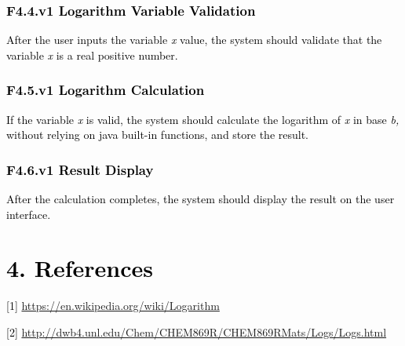 \documentclass[letterpaper]{article}
\begin{document}
\subsubsection[F4.4.v1 Logarithm Variable Validation]{\textbf{\textcolor{black}{F4.4.v1 Logarithm Variable Validation}}}
\textcolor{black}{After the user inputs the variable }\textit{\textcolor{black}{x}}\textcolor{black}{ value, the system
should validate that the variable }\textit{\textcolor{black}{x}}\textcolor{black}{ is a real positive number.}

\subsubsection[F4.5.v1 Logarithm Calculation]{\textbf{\textcolor{black}{F4.5.v1 Logarithm Calculation}}}
\textcolor{black}{If the variable }\textit{\textcolor{black}{x}}\textcolor{black}{ is valid, the system should calculate
the logarithm of }\textit{\textcolor{black}{x}}\textcolor{black}{ in base
}\textit{\textcolor{black}{b,}}\textcolor{black}{ without relying on java built-in functions, and store the result.}

\subsubsection[F4.6.v1 Result Display]{\textbf{\textcolor{black}{F4.6.v1 Result Display}}}
\textcolor{black}{After the calculation completes, the system should display the result on the user interface.}

\section[4. References]{\textbf{\textcolor{black}{4. References}}}
\textcolor{black}{[1] }\url{https://en.wikipedia.org/wiki/Logarithm}

\textcolor{black}{[2] }\url{http://dwb4.unl.edu/Chem/CHEM869R/CHEM869RMats/Logs/Logs.html}


\bigskip


\bigskip


\bigskip
\end{document}

